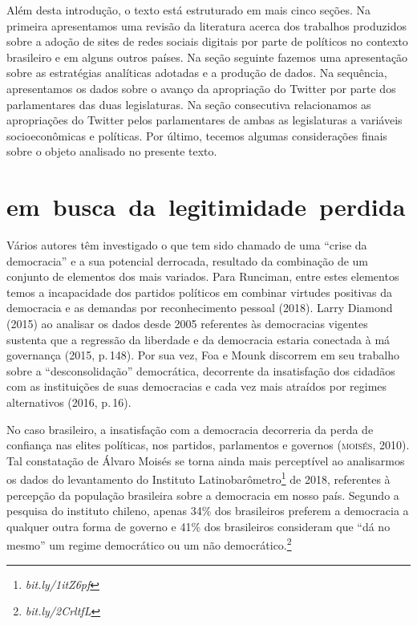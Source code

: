 Além desta introdução, o texto está estruturado em mais cinco seções. Na
primeira apresentamos uma revisão da literatura acerca dos trabalhos
produzidos sobre a adoção de sites de redes sociais digitais por parte
de políticos no contexto brasileiro e em alguns outros países. Na seção
seguinte fazemos uma apresentação sobre as estratégias analíticas
adotadas e a produção de dados. Na sequência, apresentamos os dados
sobre o avanço da apropriação do Twitter por parte dos parlamentares das
duas legislaturas. Na seção consecutiva relacionamos as apropriações do
Twitter pelos parlamentares de ambas as legislaturas a variáveis
socioeconômicas e políticas. Por último, tecemos algumas considerações
finais sobre o objeto analisado no presente texto.


\section{em~busca~da~legitimidade~perdida}

Vários autores têm investigado o que tem sido chamado de uma ``crise da
democracia'' e a sua potencial derrocada, resultado da combinação de um
conjunto de elementos dos mais variados. Para Runciman, entre estes
elementos temos a incapacidade dos partidos políticos em combinar
virtudes positivas da democracia e as demandas por reconhecimento
pessoal (2018). Larry Diamond (2015) ao analisar os dados desde 2005
referentes às democracias vigentes sustenta que a regressão da liberdade
e da democracia estaria conectada à má governança (2015, p.\,148). Por sua
vez, Foa e Mounk discorrem em seu trabalho sobre a ``desconsolidação''
democrática, decorrente da insatisfação dos cidadãos com as instituições
de suas democracias e cada vez mais atraídos por regimes alternativos
(2016, p.\,16).

No caso brasileiro, a insatisfação com a democracia decorreria da perda
de confiança nas elites políticas, nos partidos, parlamentos e governos
(\textsc{moisés}, 2010). Tal constatação de Álvaro Moisés se torna ainda mais
perceptível ao analisarmos os dados do levantamento do Instituto
Latinobarômetro\footnote{\textit{bit.ly/1itZ6pf}}
de 2018, referentes à percepção da população brasileira sobre a
democracia em nosso país. Segundo a pesquisa do instituto chileno,
apenas 34\% dos brasileiros preferem a democracia a qualquer outra forma
de governo e 41\% dos brasileiros consideram que ``dá no mesmo'' um
regime democrático ou um não democrático.\footnote{\textit{bit.ly/2CrltfL}}

